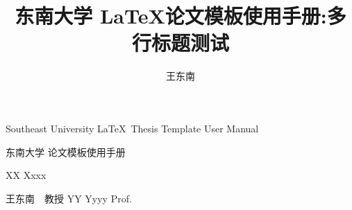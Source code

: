 \documentclass[algorithmlist,figurelist,tablelist,nomlist,nocolorlinks,bookmarksnumbered]{template/seumasterthesis}
\begin{document}
\raggedbottom %


\title
    {东南大学 \LaTeX 论文模板使用手册:多行标题测试}        %
    {}
    {Southeast University \LaTeX ~Thesis Template User Manual}  %
    {}

\spine
    {东南大学  论文模板使用手册} 
    {}                                                               

\author
    {王东南}                        %
    {XX Xxxx}                  %

\advisor
    {王东南　教授}                %
    {YY Yyyy}        %
    {Prof.}                     %
    
\end{document}
